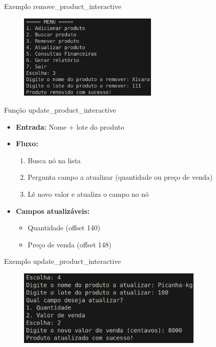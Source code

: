 \documentclass{beamer}
\begin{document}
\begin{frame}{Exemplo remove\_product\_interactive}
    \begin{figure}
        \centering
        \includegraphics[width=0.6\textwidth]{img/remover.png}
    \end{figure}
\end{frame}

\begin{frame}{Função update\_product\_interactive}
    \begin{itemize}
        \item \textbf{Entrada:} Nome + lote do produto
        \item \textbf{Fluxo:}
        \begin{enumerate}
            \item Busca nó na lista
            \item Pergunta campo a atualizar (quantidade ou preço de venda)
            \item Lê novo valor e atualiza o campo no nó
        \end{enumerate}
        \item \textbf{Campos atualizáveis:}
        \begin{itemize}
            \item Quantidade (offset 140)
            \item Preço de venda (offset 148)
        \end{itemize}
    \end{itemize}
\end{frame}

\begin{frame}{Exemplo update\_product\_interactive}
    \begin{figure}
        \centering
        \includegraphics[width=0.8\textwidth]{img/update.png}
    \end{figure}
\end{frame}
\end{document}
